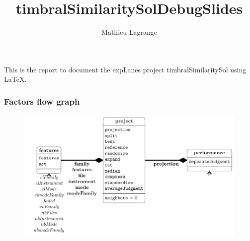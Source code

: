 \documentclass{beamer}
\title{timbralSimilaritySolDebugSlides}
\author{ Mathieu Lagrange }
\begin{document}
           
 
\maketitle           
 
 
This is the report to document the expLanes project timbralSimilaritySol using \LaTeX.           
 
 
 
 
 
\begin{frame}\frametitle{Factors flow graph}         
 
 
\begin{center}        
 
 
\begin{figure}       
 
 
\includegraphics[width=\textwidth,height=0.8\textheight,keepaspectratio]{../figures/factors.pdf}      
 
 
\label{factorFlowGraph}     
 
 
\end{figure}    
 
 
\end{center}   
 
 
\end{frame}  
 
\end{document}

